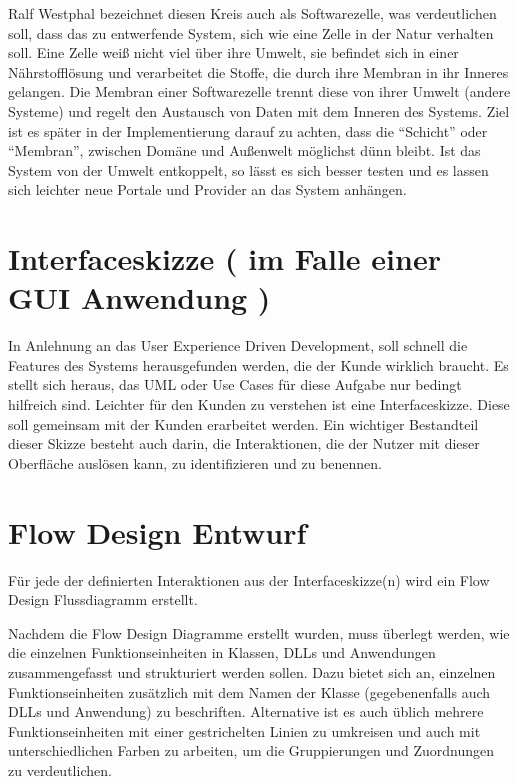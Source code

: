 Ralf Westphal bezeichnet diesen Kreis auch als Softwarezelle, was
verdeutlichen soll, dass das zu entwerfende System, sich wie eine Zelle in der
Natur verhalten soll. Eine Zelle weiß nicht viel über ihre Umwelt, sie befindet sich in
einer Nährstofflösung und verarbeitet die Stoffe, die durch ihre Membran in
ihr Inneres gelangen. Die Membran einer Softwarezelle trennt diese von
ihrer Umwelt (andere Systeme) und regelt den Austausch von Daten mit dem
Inneren des Systems. Ziel ist es später in der Implementierung darauf zu
achten, dass die \enquote{Schicht} oder \enquote{Membran}, zwischen Domäne und Außenwelt möglichst
dünn bleibt.
Ist das System von der Umwelt entkoppelt, so lässt es sich besser testen und es
lassen sich leichter neue Portale und Provider an das System anhängen.

\section{Interfaceskizze ( im Falle einer GUI Anwendung )}

In Anlehnung an das User Experience Driven Development, soll schnell die
Features des Systems herausgefunden werden, die der Kunde wirklich
braucht. Es stellt sich heraus, das UML oder Use Cases für diese Aufgabe nur
bedingt hilfreich sind. Leichter für den Kunden zu verstehen ist eine
Interfaceskizze.
Diese soll gemeinsam mit der Kunden erarbeitet werden. Ein wichtiger Bestandteil
dieser Skizze besteht auch darin, die Interaktionen, die der
Nutzer mit dieser Oberfläche auslösen kann, zu identifizieren und zu benennen.

\section{Flow Design Entwurf}

Für jede der definierten Interaktionen aus der Interfaceskizze(n) wird ein Flow Design Flussdiagramm
erstellt.

Nachdem die Flow Design Diagramme erstellt wurden, muss überlegt werden, wie die
einzelnen Funktionseinheiten in Klassen, DLLs und Anwendungen zusammengefasst
und strukturiert werden sollen.
Dazu bietet sich an, einzelnen Funktionseinheiten zusätzlich mit dem Namen der
Klasse (gegebenenfalls auch DLLs und Anwendung) zu beschriften. Alternative ist es
auch üblich mehrere Funktionseinheiten mit einer gestrichelten Linien zu
umkreisen und auch mit unterschiedlichen Farben zu arbeiten, um die Gruppierungen und Zuordnungen zu verdeutlichen. 

